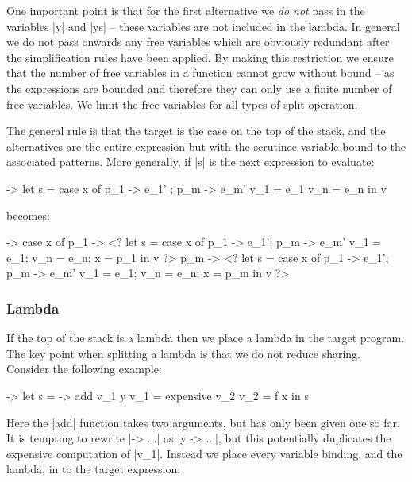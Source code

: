 \documentclass[draft]{sigplanconf}
\begin{document}
One important point is that for the first alternative we \textit{do not} pass in the variables |y| and |ys| -- these variables are not included in the lambda. In general we do not pass onwards any free variables which are obviously redundant after the simplification rules have been applied. By making this restriction we ensure that the number of free variables in a function cannot grow without bound -- as the expressions are bounded and therefore they can only use a finite number of free variables. We limit the free variables for all types of split operation.

The general rule is that the target is the case on the top of the stack, and the alternatives are the entire expression but with the scrutinee variable bound to the associated patterns. More generally, if |s| is the next expression to evaluate:

\begin{code}
\free ->  let  s    = case x of p_1 -> e_1' ; p_m -> e_m'
               v_1  = e_1
               v_n  = e_n
          in   v
\end{code}

\noindent becomes:

\begin{code}
\free -> case x of
    p_1  -> <? let  s    = case x of p_1 -> e_1'; p_m -> e_m'
                    v_1  = e_1; v_n = e_n; x = p_1 in v ?>
    p_m  -> <? let  s    = case x of p_1 -> e_1'; p_m -> e_m'
                    v_1  = e_1; v_n = e_n; x = p_m in v ?>
\end{code}

\subsubsection{Lambda}
\label{sec:eval_split_lambda}

If the top of the stack is a lambda then we place a lambda in the target program. The key point when splitting a lambda is that we do not reduce sharing. Consider the following example:

\begin{code}
\x ->  let  s    = \y -> add v_1 y
            v_1  = expensive v_2
            v_2  = f x
       in   s
\end{code}

Here the |add| function takes two arguments, but has only been given one so far. It is tempting to rewrite |\x -> ...| as |\x y -> ...|, but this potentially duplicates the expensive computation of |v_1|. Instead we place every variable binding, and the lambda, in to the target expression:
\end{document}
